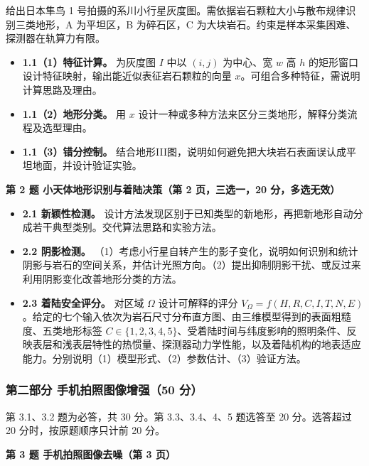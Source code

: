 \documentclass[UTF8,a4paper,zihao=-4,fontset=fandol]{ctexart}
\begin{document}
给出日本隼鸟 1 号拍摄的系川小行星灰度图。需依据岩石颗粒大小与散布规律识别三类地形，A 为平坦区，B 为碎石区，C 为大块岩石。约束是样本采集困难、探测器在轨算力有限。\par

\begin{itemize}
\item \textbf{1.1（1）特征计算。} 为灰度图 $I$ 中以 $(i,j)$ 为中心、宽 $w$ 高 $h$ 的矩形窗口设计特征映射，输出能近似表征岩石颗粒的向量 $x$。可组合多种特征，需说明计算思路及理由。
\item \textbf{1.1（2）地形分类。} 用 $x$ 设计一种或多种方法来区分三类地形，解释分类流程及选型理由。
\item \textbf{1.1（3）错分控制。} 结合地形\textup{III}图，说明如何避免把大块岩石表面误认成平坦地面，并设计验证实验。
\end{itemize}

\textbf{第 2 题 小天体地形识别与着陆决策（第 2 页，三选一，20 分，多选无效）}\par

\begin{itemize}
\item \textbf{2.1 新颖性检测。} 设计方法发现区别于已知类型的新地形，再把新地形自动分成若干典型类别。交代算法思路和实验方法。
\item \textbf{2.2 阴影检测。} （1）考虑小行星自转产生的影子变化，说明如何识别和统计阴影与岩石的空间关系，并估计光照方向。（2）提出抑制阴影干扰、或反过来利用阴影变化改善地形分类的方法。
\item \textbf{2.3 着陆安全评分。} 对区域 $\Omega$ 设计可解释的评分 $V_\Omega=f(H,R,C,I,T,N,E)$。给定的七个输入依次为岩石尺寸分布直方图、由三维模型得到的表面粗糙度、五类地形标签 $C\in\{1,2,3,4,5\}$、受着陆时间与纬度影响的照明条件、反映表层和浅表层特性的热惯量、探测器动力学性能，以及着陆机构的地表适应能力。分别说明（1）模型形式、（2）参数估计、（3）验证方法。
\end{itemize}

\subsubsection{第二部分 手机拍照图像增强（50 分）}

第 3.1、3.2 题为必答，共 30 分。第 3.3、3.4、4、5 题选答至 20 分。选答超过 20 分时，按原题顺序只计前 20 分。\par

\textbf{第 3 题 手机拍照图像去噪（第 3 页）}\par
\end{document}
